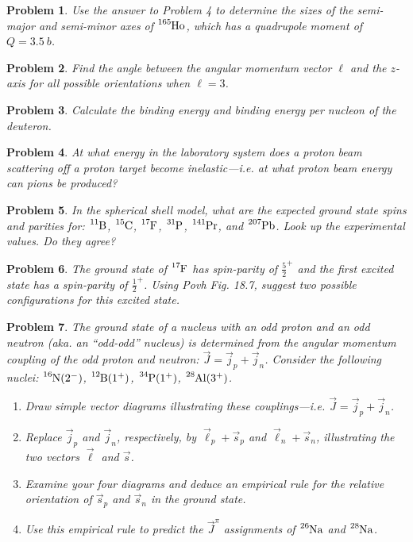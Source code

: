 \documentclass{article}
\newtheorem{plm}{Problem}
\begin{document}
\begin{plm}
  Use the answer to Problem 4 to determine the sizes of the semi-major and semi-minor axes of $\ce{^{165}Ho}$,
  which has a quadrupole moment of $Q = \SI{3.5}{b}$.
\end{plm}
\begin{plm}
  Find the angle between the angular momentum vector $\ell$ and the $z$-axis for all possible orientations when $\ell = 3$.
\end{plm}
\begin{plm}
  Calculate the binding energy and binding energy per nucleon of the deuteron.
\end{plm}
\begin{plm}
  At what energy in the laboratory system does a proton beam scattering off a proton target become inelastic---i.e.
  at what proton beam energy can pions be produced?
\end{plm}
\begin{plm}
  In the spherical shell model, what are the expected ground state spins and parities for:
  $\ce{^{11}B}$, $\ce{^{15}C}$, $\ce{^{17}F}$, $\ce{^{31}P}$, $\ce{^{141}Pr}$, and $\ce{^{207}Pb}$.
  Look up the experimental values.
  Do they agree?
\end{plm}
\begin{plm}
  The ground state of $\ce{^{17}F}$ has spin-parity of $\frac{5}{2}^{+}$ and the first excited state has a spin-parity of $\frac{1}{2}^{+}$.
  Using Povh Fig. 18.7, suggest two possible configurations for this excited state.
\end{plm}
\begin{plm}
  The ground state of a nucleus with an odd proton and an odd neutron (aka. an ``odd-odd'' nucleus)
  is determined from the angular momentum coupling of the odd proton and neutron: $\vec{J} = \vec{j}_{p} + \vec{j}_{n}$.
  Consider the following nuclei: $\ce{^{16}N}(2^{-})$, $\ce{^{12}B}(1^{+})$, $\ce{^{34}P}(1^{+})$, $\ce{^{28}Al}(3^{+})$.
  \begin{enumerate}
  \item Draw simple vector diagrams illustrating these couplings---i.e.  $\vec{J} = \vec{j}_{p} + \vec{j}_{n}$.
  \item Replace $\vec{j}_{p}$ and $\vec{j}_{n}$, respectively, by $\vec{\ell}_{p} + \vec{s}_{p}$ and $\vec{\ell}_{n} + \vec{s}_{n}$,
    illustrating the two vectors $\vec{\ell}$ and $\vec{s}$.
  \item Examine your four diagrams and deduce an empirical rule for the relative orientation
    of $\vec{s}_{p}$ and $\vec{s}_{n}$ in the ground state.
  \item Use this empirical rule to predict the $\vec{J}^{\pi}$ assignments of $\ce{^{26}Na}$ and $\ce{^{28}Na}$.
  \end{enumerate}
\end{plm}
\end{document}
